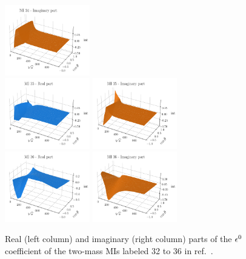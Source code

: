 \documentclass[11pt,a4paper]{article}
\begin{document}
\begin{figure}[!ht]
\begin{center}
\includegraphics[width=0.33\textwidth]{plots/plotMI34im.pdf}\\\vspace{-0.1cm}
\includegraphics[width=0.33\textwidth]{plots/plotMI35.pdf}\hspace{2cm}
\includegraphics[width=0.33\textwidth]{plots/plotMI35im.pdf}\\\vspace{-0.1cm}
\includegraphics[width=0.33\textwidth]{plots/plotMI36.pdf}\hspace{2cm}
\includegraphics[width=0.33\textwidth]{plots/plotMI36im.pdf}
\end{center}
\vspace{-1cm}
\caption{\label{fig:MIs}
Real (left column) and imaginary (right column) parts of the $\epsilon^0$ coefficient of the two-mass MIs labeled 32 to 36 in ref.~\cite{Bonciani:2016ypc}.
  }
\end{figure}
\end{document}
